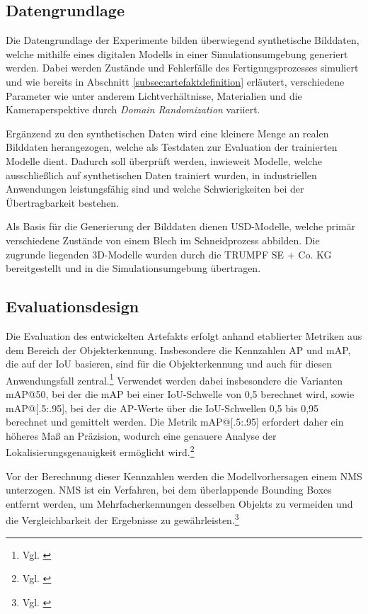\subsection{Datengrundlage}
Die Datengrundlage der Experimente bilden überwiegend synthetische Bilddaten, welche mithilfe eines digitalen Modells in einer Simulationsumgebung generiert werden. Dabei werden Zustände und Fehlerfälle des Fertigungsprozesses simuliert und wie bereits in Abschnitt \ref{subsec:artefaktdefinition} erläutert, verschiedene Parameter wie unter anderem Lichtverhältnisse, Materialien und die Kameraperspektive durch \textit{Domain Randomization} variiert.

Ergänzend zu den synthetischen Daten wird eine kleinere Menge an realen Bilddaten herangezogen, welche als Testdaten zur Evaluation der trainierten Modelle dient. Dadurch soll überprüft werden, inwieweit Modelle, welche ausschließlich auf synthetischen Daten trainiert wurden, in industriellen Anwendungen leistungsfähig sind und welche Schwierigkeiten bei der Übertragbarkeit bestehen.

Als Basis für die Generierung der Bilddaten dienen \ac{USD}-Modelle, welche primär verschiedene Zustände von einem Blech im Schneidprozess abbilden. Die zugrunde liegenden 3D-Modelle wurden durch die TRUMPF SE + Co. KG bereitgestellt und in die Simulationsumgebung übertragen.


\subsection{Evaluationsdesign}\label{subsec:evaluationsdesign}
Die Evaluation des entwickelten Artefakts erfolgt anhand etablierter Metriken aus dem Bereich der Objekterkennung. Insbesondere die Kennzahlen \acf{AP} und \acf{mAP}, die auf der \acf{IoU} basieren, sind für die Objekterkennung und auch für diesen Anwendungsfall zentral.\footnote{Vgl. \cite[94272]{khanam_comprehensive_2024}} Verwendet werden dabei insbesondere die Varianten \ac{mAP}@50, bei der die \ac{mAP} bei einer \ac{IoU}-Schwelle von 0,5 berechnet wird, sowie \ac{mAP}@[.5:.95], bei der die \ac{AP}-Werte über die \ac{IoU}-Schwellen 0,5 bis 0,95 berechnet und gemittelt werden. Die Metrik \ac{mAP}@[.5:.95] erfordert daher ein höheres Maß an Präzision, wodurch eine genauere Analyse der Lokalisierungsgenauigkeit ermöglicht wird.\footnote{Vgl. \cite[S. 94272 f.]{khanam_comprehensive_2024}}

Vor der Berechnung dieser Kennzahlen werden die Modellvorhersagen einem \acf{NMS} unterzogen. \ac{NMS} ist ein Verfahren, bei dem überlappende Bounding Boxes entfernt werden, um Mehrfacherkennungen desselben Objekts zu vermeiden und die Vergleichbarkeit der Ergebnisse zu gewährleisten.\footnote{Vgl. \cite[S. 4508 f.]{hosang_learning_2017}}

